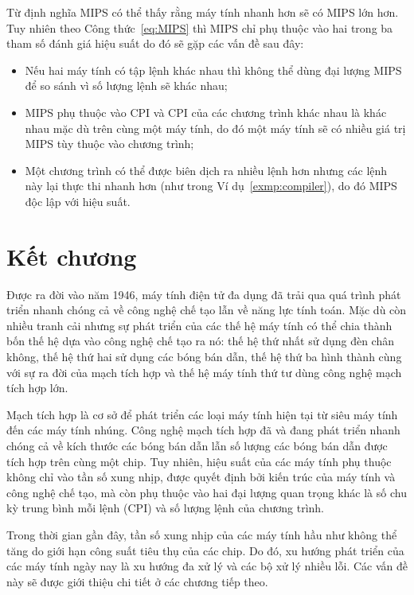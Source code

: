 Từ định nghĩa MIPS có thể thấy rằng máy tính nhanh hơn sẽ có MIPS lớn hơn. Tuy nhiên theo Công thức~\ref{eq:MIPS} thì MIPS chỉ phụ thuộc vào hai trong ba tham số đánh giá hiệu suất do đó sẽ gặp các vấn đề sau đây:
\begin{itemize}[-]
\item Nếu hai máy tính có tập lệnh khác nhau thì không thể dùng đại lượng MIPS để so sánh vì số lượng lệnh sẽ khác nhau;
\item MIPS phụ thuộc vào CPI và CPI của các chương trình khác nhau là khác nhau mặc dù trên cùng một máy tính, do đó một máy tính sẽ có nhiều giá trị MIPS tùy thuộc vào chương trình;
\item Một chương trình có thể được biên dịch ra nhiều lệnh hơn nhưng các lệnh này lại thực thi nhanh hơn (như trong Ví dụ~\ref{exmp:compiler}), do đó MIPS độc lập với hiệu suất.
\end{itemize}

\section{Kết chương}

Được ra đời vào năm 1946, máy tính điện tử đa dụng đã trải qua quá trình phát triển nhanh chóng cả về công nghệ chế tạo lẫn về năng lực tính toán. Mặc dù còn nhiều tranh cải nhưng sự phát triển của các thế hệ máy tính có thể chia thành bốn thế hệ dựa vào công nghệ chế tạo ra nó: thế hệ thứ nhất sử dụng đèn chân không, thế hệ thứ hai sử dụng các bóng bán dẫn, thế hệ thứ ba hình thành cùng với sự ra đời của mạch tích hợp và thế hệ máy tính thứ tư dùng công nghệ mạch tích hợp lớn.

Mạch tích hợp là cơ sở để phát triển các loại máy tính hiện tại từ siêu máy tính đến các máy tính nhúng. Công nghệ mạch tích hợp đã và đang phát triển nhanh chóng cả về kích thước các bóng bán dẫn lẫn số lượng các bóng bán dẫn được tích hợp trên cùng một chip. Tuy nhiên, hiệu suất của các máy tính phụ thuộc không chỉ vào tần số xung nhịp, được quyết định bởi kiến trúc của máy tính và công nghệ chế tạo, mà còn phụ thuộc vào hai đại lượng quan trọng khác là số chu kỳ trung bình mỗi lệnh (CPI) và số lượng lệnh của chương trình.

Trong thời gian gần đây, tần số xung nhịp của các máy tính hầu như không thể tăng do giới hạn công suất tiêu thụ của các chip. Do đó, xu hướng phát triển của các máy tính ngày nay là xu hướng đa xử lý và các bộ xử lý nhiều lỗi. Các vấn đề này sẽ được giới thiệu chi tiết ở các chương tiếp theo.

